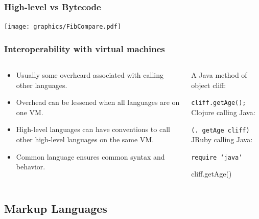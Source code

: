 \documentclass{beamer}
\newcommand{\linespace}{\vskip 0.25cm}
\begin{document}
\begin{frame}
  \frametitle{High-level vs Bytecode}
  \texttt{[image: graphics/FibCompare.pdf]}
\end{frame}

\begin{frame}
 \frametitle{Interoperability with virtual machines}
 \begin{columns}
 \begin{column}{0.5\textwidth}
 \begin{itemize}
 \item Usually some overheard associated with calling other languages.
 \item Overhead can be lessened when all languages are on one VM.
 \item High-level languages can have conventions to call other high-level languages on the same VM.
 \item Common language ensures common syntax and behavior.
 \end{itemize}
 \end{column}
 
 \begin{column}{0.5\textwidth}
 
 A Java method of object cliff:

 {\tt cliff.getAge();}
 \linespace
 \linespace
 \linespace
 Clojure calling Java:
 
 {\tt (. getAge cliff)}
 \linespace
 \linespace
 JRuby calling Java:
 
 {\tt require `java'
 
 cliff.getAge()}
 \end{column}
 \end{columns}
\end{frame}
\subsection{Markup Languages}
\end{document}
